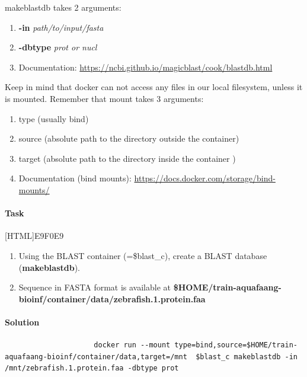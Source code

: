 \documentclass[12pt]{article}
\begin{document}
				makeblastdb takes 2 arguments: 
				
				\begin{enumerate}
					\item \textbf{-in} \textit{path/to/input/fasta}  
					\item \textbf{-dbtype} \textit{prot or nucl}
					\item Documentation: \url{https://ncbi.github.io/magicblast/cook/blastdb.html}
				\end{enumerate}
				
				Keep in mind that docker can not access any files in our local filesystem, unless it is mounted. 
				Remember that mount takes 3 arguments: 
				
				\begin{enumerate}
					\item type (usually bind)  
					\item source (absolute path to the directory outside the container)
					\item target (absolute path to the directory inside the container )
					\item Documentation (bind mounts): \url{https://docs.docker.com/storage/bind-mounts/}
				\end{enumerate}
			
		

			\paragraph{Task}
				[HTML]{E9F0E9}{\parbox{\linewidth}{%
					\begin{enumerate}
						\item Using the BLAST container (=\$blast\_c), create a BLAST database (\textbf{makeblastdb}).
						\item Sequence in FASTA format is available at \textbf{\$HOME/train-aquafaang-bioinf/container/data/zebrafish.1.protein.faa}		
					\end{enumerate}
				}}
			
			\paragraph{Solution}	
		
				\begin{minipage}{\linewidth}
					\begin{lstlisting}
					 docker run --mount type=bind,source=$HOME/train-aquafaang-bioinf/container/data,target=/mnt  $blast_c makeblastdb -in /mnt/zebrafish.1.protein.faa -dbtype prot
		 			\end{lstlisting}
				\end{minipage}
			
\end{document}
